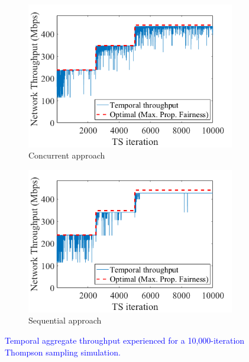 \documentclass[preprint,12pt]{elsarticle}
\begin{document}
	\begin{figure}[h!]
		\centering
		\begin{subfigure}[b]{0.45\textwidth}
			\includegraphics[width=\textwidth]{images/temporal_aggregate_tpt_dynamic_scenario_async_TS}
			\caption{Concurrent approach}
			\label{fig:temporal_aggregate_tpt_dynamic_scenario_async_TS}
		\end{subfigure}
		\begin{subfigure}[b]{0.45\textwidth}
			\includegraphics[width=\textwidth]{images/temporal_aggregate_tpt_dynamic_scenario_ordered_TS}
			\caption{Sequential approach}
			\label{fig:temporal_aggregate_tpt_dynamic_scenario_ordered_TS}
		\end{subfigure}
		\caption{\textcolor{blue}{Temporal aggregate throughput experienced for a 10,000-iteration Thompson sampling simulation.}}
		\label{fig:dynamic_enviroment}
	\end{figure}
	
\end{document}
